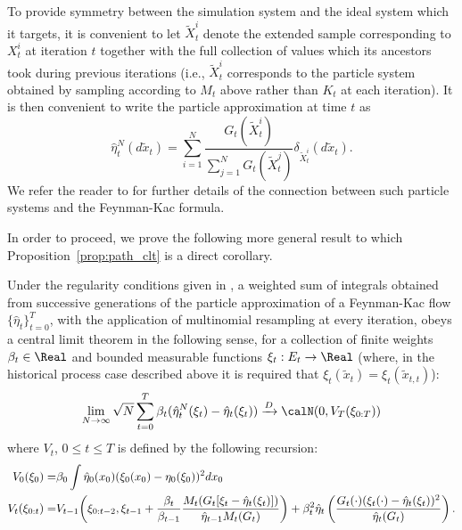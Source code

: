 To provide symmetry between the simulation system and the ideal system which
it targets, it is convenient to let $\tilde{X}_t^i$ denote the extended
sample corresponding to $X_t^i$ at iteration $t$ together with the full
collection of values which its ancestors took during previous iterations
(i.e., $\tilde{X}_t^i$ corresponds to the particle system obtained by
sampling according to $M_t$ above rather than $K_t$ at each iteration). It is
then convenient to write the particle approximation at time $t$ as
\begin{equation*}
  \hat\eta_t^N(d\tilde{x}_t) = \sum_{i=1}^N
  \frac{G_t(\tilde{X}_t^i)}{\sum_{j=1}^N G_t(\tilde{X}_t^j)}
  \delta_{\tilde{X}_t^i}(d\tilde{x}_t).
\end{equation*}
We refer the reader to
\cite{DelMoral:2004ux} for further details of the connection between such
particle systems and the Feynman-Kac formula.

In order to proceed, we prove the following more general result to which
Proposition~\ref{prop:path_clt} is a direct corollary.

\begin{proposition}\label{prop:gen_clt}
  Under the regularity conditions given in \cite[section 9.4, pp.
  300--306]{DelMoral:2004ux}, a weighted sum of integrals obtained from
  successive generations of the particle approximation of a Feynman-Kac flow
  $\{\hat\eta_t\}_{t=0}^T$, with the application of multinomial resampling
  at every iteration, obeys a central limit theorem in the following sense,
  for a collection of finite weights $\beta_t\in\Real$ and bounded measurable
  functions $\xi_t:E_t \to\Real$ (where, in the historical process case
  described above it is required that $\xi_t(\tilde{x}_t) =
  \xi_t(\tilde{x}_{t,t})$):
  \begin{equation}
    \lim_{N\to\infty}\sqrt{N}
    \sum_{t=0}^T\beta_t(\hat\eta_t^N(\xi_t)-\hat\eta_t(\xi_t))
    \xrightarrow{D}\calN(0,V_T(\xi_{0:T}))
  \end{equation}
  where $V_t$, $0\le t \le T$ is defined by the following recursion:
  \begin{align}
    V_0(\xi_0) =& \beta_0 \int \hat\eta_0(x_0)(\xi_0(x_0) -
    \eta_0(\xi_0))^2 dx_0\notag\\
    V_t(\xi_{0:t}) =& V_{t-1}\biggl(\xi_{0:t-2}, \xi_{t-1}
    + \frac{\beta_t}{\beta_{t-1}}
    \frac{M_t(G_t[\xi_t-\hat\eta_t(\xi_t)])}{\hat\eta_{t-1}M_t(G_t)}\biggr)
    + \beta_t^2\hat\eta_t\left(\frac{G_t(\cdot) (\xi_t(\cdot)-\hat\eta_t(\xi_t))^2}{\hat\eta_t(G_t)}\right).
  \end{align}
\end{proposition}

